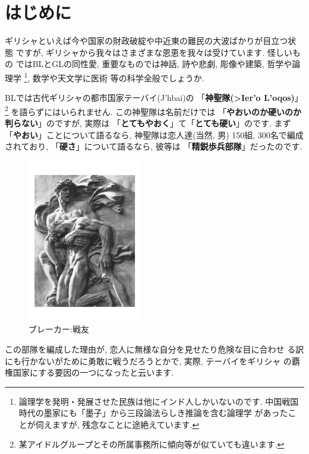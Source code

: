 \section{はじめに}

ギリシャといえば今や国家の財政破綻や中近東の難民の大波ばかりが目立つ状態
ですが, ギリシャから我々はさまざまな恩恵を我々は受けています. 怪しいもの
ではBLとGLの同性愛, 重要なものでは神話, 詩や悲劇, 彫像や建築, 哲学や論理学
\footnote{論理学を発明・発展させた民族は他にインド人しかいないのです.
 中国戦国時代の墨家にも「墨子」\cite{墨子}から三段論法らしき推論を含む論理学
があったことが伺えますが, 残念なことに途絶えています.}, 数学や天文学に医術
等の科学全般でしょうか.
\newline

BLでは古代ギリシャの都市国家テーバイ(\textgreek{J'hbai})の
「\textbf{神聖隊(\textgreek{>Ier'o L'oqos})}」
\footnote{某アイドルグループとその所属事務所に傾向等が似ていても違います.}
を語らずにはいられません. この神聖隊は名前だけでは
「\textbf{やおいのか硬いのか判らない}」のですが, 実際は
「\textbf{とてもやおく}」て「\textbf{とても硬い}」のです. まず
「\textbf{やおい}」ことについて語るなら, 神聖隊は恋人達(当然, 男)
150組, 300名で編成されており, 「\textbf{硬さ}」について語るなら, 彼等は
「\textbf{精鋭歩兵部隊}」だったのです.
\newline
 
 
\begin{figure}
\includegraphics[width=5cm]{arno_breker_kameradschaft.pdf}
\caption{ブレーカー:戦友}
\label{fig:breker2}
\end{figure}

この部隊を編成した理由が, 恋人に無様な自分を見せたり危険な目に合わせ
る訳にも行かないがために勇敢に戦うだろうとかで, 実際, テーバイをギリシャ
の覇権国家にする要因の一つになったと云います.
\newline

